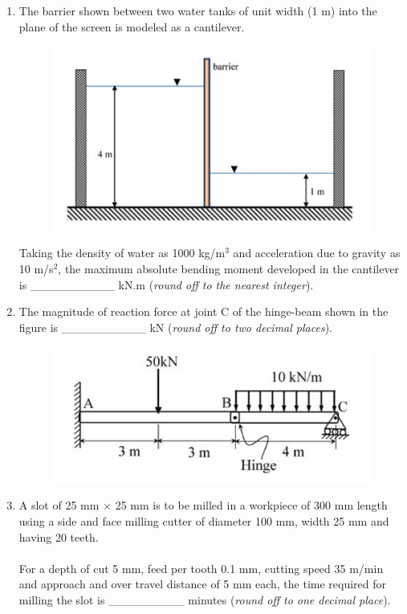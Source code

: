 \documentclass[12pt,onecolumn]{article}
\begin{document}
\begin{enumerate}
    \item The barrier shown between two water tanks of unit width (1 m) into the plane of the screen is modeled as a cantilever.
          \begin{figure}[H]
              \centering
              \includegraphics[scale=0.5]{q40}
              \label{fig:q40}
          \end{figure}
          Taking the density of water as 1000 kg/m$^3$ and acceleration due to gravity as 10 m/s$^2$, the maximum absolute bending moment developed in the cantilever is \_\_\_\_\_\_\_\_\_\_ kN.m (\textit{round off to the nearest integer}).

    \item The magnitude of reaction force at joint C of the hinge-beam shown in the figure is \_\_\_\_\_\_\_\_\_\_ kN (\textit{round off to two decimal places}).
          \begin{figure}[H]
              \centering
              \includegraphics[scale=0.5]{q41}
              \label{fig:q41}
          \end{figure}

    \item A slot of 25 mm $\times$ 25 mm is to be milled in a workpiece of 300 mm length using a side and face milling cutter of diameter 100 mm, width 25 mm and having 20 teeth.\\\\
          For a depth of cut 5 mm, feed per tooth 0.1 mm, cutting speed 35 m/min and approach and over travel distance of 5 mm each, the time required for milling the slot is \_\_\_\_\_\_\_\_\_ minutes (\textit{round off to one decimal place}).


\end{enumerate}
\end{document}
